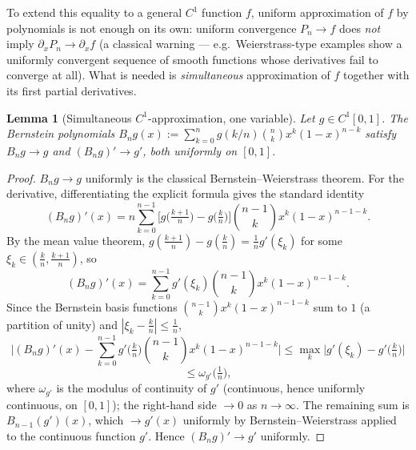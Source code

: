 \documentclass[11pt,fleqn]{article}
\theoremstyle{plain}
\newtheorem{lemma}[thm]{Lemma}
\theoremstyle{remark}
\begin{document}
To extend this equality to a general $C^1$ function $f$, uniform
approximation of $f$ by polynomials is not enough on its own: uniform
convergence $P_n\to f$ does \emph{not} imply $\partial_xP_n\to\partial_xf$
(a classical warning --- e.g.\ Weierstrass-type examples show a uniformly
convergent sequence of smooth functions whose derivatives fail to
converge at all). What is needed is \emph{simultaneous} approximation of
$f$ together with its first partial derivatives.

\begin{lemma}[Simultaneous $C^1$-approximation, one variable]\label{lem:c1-approx-1d}
Let $g\in C^1[0,1]$. The Bernstein polynomials
$B_ng(x):=\sum_{k=0}^ng(k/n)\binom nkx^k(1-x)^{n-k}$ satisfy
$B_ng\to g$ and $(B_ng)'\to g'$, both uniformly on $[0,1]$.
\end{lemma}
\begin{proof}
$B_ng\to g$ uniformly is the classical Bernstein--Weierstrass theorem.
For the derivative, differentiating the explicit formula gives the
standard identity
\[
(B_ng)'(x)=n\sum_{k=0}^{n-1}\Big[g\big(\tfrac{k+1}n\big)-g\big(\tfrac kn\big)\Big]\binom{n-1}k x^k(1-x)^{n-1-k}.
\]
By the mean value theorem, $g(\tfrac{k+1}n)-g(\tfrac kn)=\tfrac1ng'(\xi_k)$
for some $\xi_k\in(\tfrac kn,\tfrac{k+1}n)$, so
\[
(B_ng)'(x)=\sum_{k=0}^{n-1}g'(\xi_k)\binom{n-1}kx^k(1-x)^{n-1-k}.
\]
Since the Bernstein basis functions $\binom{n-1}kx^k(1-x)^{n-1-k}$ sum to
$1$ (a partition of unity) and $|\xi_k-\tfrac kn|\le\tfrac1n$,
\[
\Big|(B_ng)'(x)-\sum_{k=0}^{n-1}g'\big(\tfrac kn\big)\binom{n-1}kx^k(1-x)^{n-1-k}\Big|
\le\max_k\Big|g'(\xi_k)-g'\big(\tfrac kn\big)\Big|
\]
\[
\le\omega_{g'}\big(\tfrac1n\big),
\]
where $\omega_{g'}$ is the modulus of continuity of $g'$ (continuous,
hence uniformly continuous, on $[0,1]$); the right-hand side $\to0$ as
$n\to\infty$. The remaining sum is $B_{n-1}(g')(x)$, which $\to g'(x)$
uniformly by Bernstein--Weierstrass applied to the continuous function
$g'$. Hence $(B_ng)'\to g'$ uniformly.
\end{proof}
\end{document}
